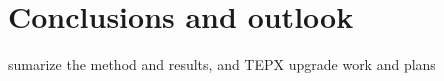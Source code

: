 \newpage \section{Conclusions and outlook} 
\label{sec:conclusion}
sumarize the method and results, and TEPX upgrade work and plans
